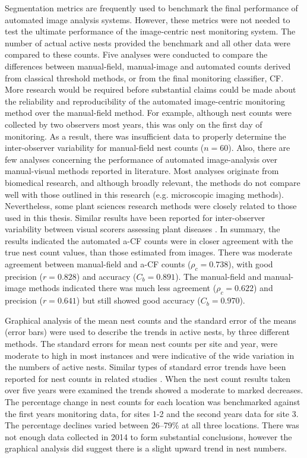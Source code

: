 Segmentation metrics are frequently used to benchmark the final performance of automated image analysis systems. However, these metrics were not needed to test the ultimate performance of the image-centric nest monitoring system. The number of actual active nests provided the benchmark and all other data were compared to these counts. Five analyses were conducted to compare the differences between manual-field, manual-image and automated counts derived from classical threshold methods, or from the final monitoring classifier, CF. More research would be required before substantial claims could be made about the reliability and reproducibility of the automated image-centric monitoring method over the manual-field method. For example, although nest counts were collected by two observers most years, this was only on the first day of monitoring. As a result, there was insufficient data to properly determine the inter-observer variability for manual-field nest counts ($n = 60$). Also, there are few analyses concerning the performance of automated image-analysis over manual-visual methods reported in literature. Most analyses originate from biomedical research, and although broadly relevant, the methods do not compare well with those outlined in this research (e.g. microscopic imaging methods). Nevertheless, some plant sciences research methods were closely related to those used in this thesis. Similar results have been reported for inter-observer variability between visual scorers assessing plant diseases \cite{Stewart2014}. In summary, the results indicated the automated a-CF counts were in closer agreement with the true nest count values, than those estimated from images. There was moderate agreement between manual-field and a-CF counts ($\rho_{c} = 0.738$), with good precision ($r = 0.828$) and accuracy ($C_{b} = 0.891$). The manual-field and manual-image methods indicated there was much less agreement ($\rho_{c} = 0.622$) and precision ($r = 0.641$) but still showed good accuracy ($C_{b} = 0.970$). 

Graphical analysis of the mean nest counts and the standard error of the means (error bars) were used to describe the trends in active nests, by three different methods. The standard errors for mean nest counts per site and year, were moderate to high in most instances and were indicative of the wide variation in the numbers of active nests. Similar types of standard error trends have been reported for nest counts in related studies \cite{Cane2008, Bischoff2003, Vinchesi2014}. When the nest count results taken over five years were examined the trends showed a moderate to marked decreases. The percentage change in nest counts for each location was benchmarked against the first years monitoring data, for sites 1-2 and the second years data for site 3. The percentage declines varied between 26--79\% at all three locations. There was not enough data collected in 2014 to form substantial conclusions, however the graphical analysis did suggest there is a slight upward trend in nest numbers.
